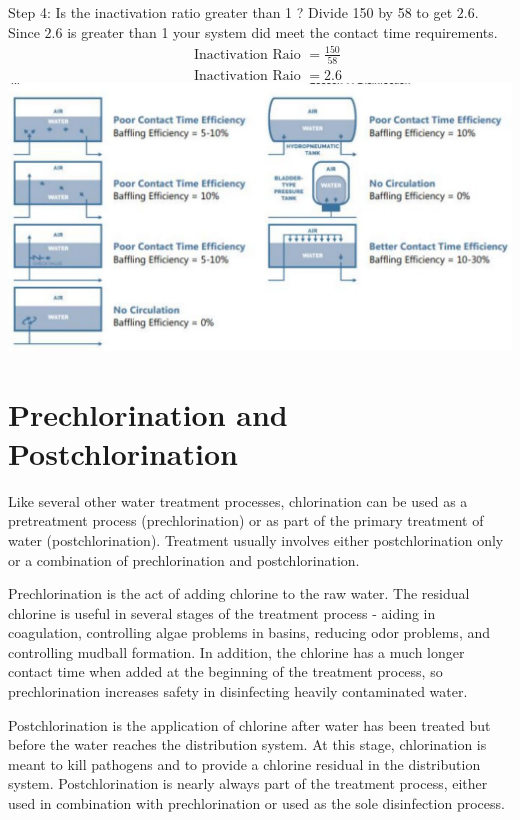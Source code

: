 \documentclass[10pt]{article}
\begin{document}
Step 4: Is the inactivation ratio greater than 1 ? Divide 150 by 58 to get $2.6$. Since $2.6$ is greater than 1 your system did meet the contact time requirements.
$$
\begin{aligned}
&\text { Inactivation Raio }=\frac{150}{58} \\
&\text { Inactivation Raio }=2.6
\end{aligned}
$$
\includegraphics[max width=\textwidth]{2022_10_14_eba0aec33b37be0fbdf2g-09}

\section{Prechlorination and Postchlorination}
Like several other water treatment processes, chlorination can be used as a pretreatment process (prechlorination) or as part of the primary treatment of water (postchlorination). Treatment usually involves either postchlorination only or a combination of prechlorination and postchlorination.

Prechlorination is the act of adding chlorine to the raw water. The residual chlorine is useful in several stages of the treatment process - aiding in coagulation, controlling algae problems in basins, reducing odor problems, and controlling mudball formation. In addition, the chlorine has a much longer contact time when added at the beginning of the treatment process, so prechlorination increases safety in disinfecting heavily contaminated water.

Postchlorination is the application of chlorine after water has been treated but before the water reaches the distribution system. At this stage, chlorination is meant to kill pathogens and to provide a chlorine residual in the distribution system. Postchlorination is nearly always part of the treatment process, either used in combination with prechlorination or used as the sole disinfection process.
\end{document}
